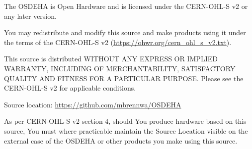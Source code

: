The OSDEHA is Open Hardware and is licensed under the CERN-OHL-S v2 or any later version.

You may redistribute and modify this source and make products using it under the terms of the CERN-OHL-S v2 (\url{https://ohwr.org/cern_ohl_s_v2.txt}).

This source is distributed WITHOUT ANY EXPRESS OR IMPLIED WARRANTY, INCLUDING OF MERCHANTABILITY, SATISFACTORY QUALITY AND FITNESS FOR A PARTICULAR PURPOSE. Please see the CERN-OHL-S v2 for applicable conditions.

Source location: \url{https://github.com/mbrennwa/OSDEHA}

As per CERN-OHL-S v2 section 4, should You produce hardware based on this source, You must where practicable maintain the Source Location visible on the external case of the OSDEHA or other products you make using this source.            


% 
% 


